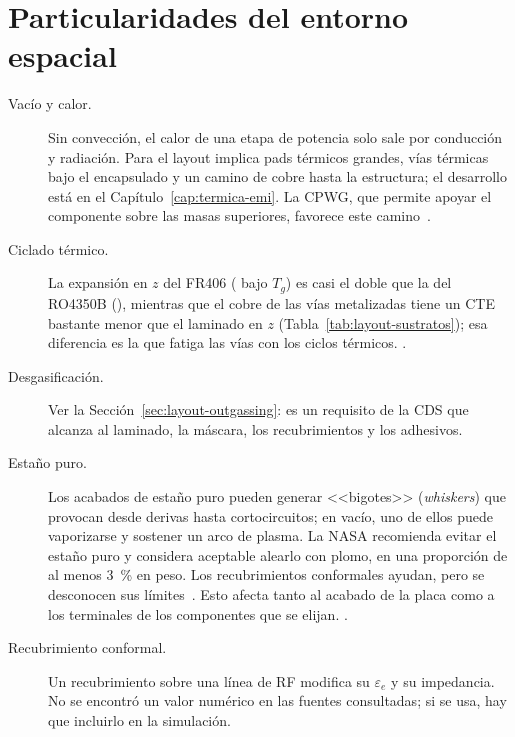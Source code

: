 \section{Particularidades del entorno espacial}\label{sec:layout-espacio}

\begin{description}
  \item[Vacío y calor.] Sin convección, el calor de una etapa de potencia solo sale por conducción y radiación. Para el layout implica pads térmicos grandes, vías térmicas bajo el encapsulado y un camino de cobre hasta la estructura; el desarrollo está en el Capítulo~\ref{cap:termica-emi}. La CPWG, que permite apoyar el componente sobre las masas superiores, favorece este camino~\cite{rfessentialscpwg}.
  \item[Ciclado térmico.] La expansión en $z$ del FR406 ( bajo $T_g$) es casi el doble que la del RO4350B (), mientras que el cobre de las vías metalizadas tiene un CTE bastante menor que el laminado en $z$ (Tabla~\ref{tab:layout-sustratos}); esa diferencia es la que fatiga las vías con los ciclos térmicos. .
  \item[Desgasificación.] Ver la Sección~\ref{sec:layout-outgassing}: es un requisito de la CDS que alcanza al laminado, la máscara, los recubrimientos y los adhesivos.
  \item[Estaño puro.] Los acabados de estaño puro pueden generar <<bigotes>> (\emph{whiskers}) que provocan desde derivas hasta cortocircuitos; en vacío, uno de ellos puede vaporizarse y sostener un arco de plasma. La NASA recomienda evitar el estaño puro y considera aceptable alearlo con plomo, en una proporción de al menos \SI{3}{\percent} en peso. Los recubrimientos conformales ayudan, pero se desconocen sus límites~\cite{brusse}. Esto afecta tanto al acabado de la placa como a los terminales de los componentes que se elijan. .
  \item[Recubrimiento conformal.] Un recubrimiento sobre una línea de RF modifica su $\varepsilon_e$ y su impedancia. No se encontró un valor numérico en las fuentes consultadas; si se usa, hay que incluirlo en la simulación.
\end{description}

